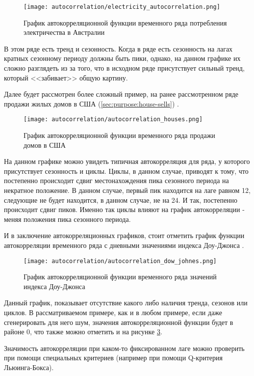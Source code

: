 \begin{figure}[h]
\centering
	\texttt{[image: autocorrelation/electricity\_autocorrelation.png]}
	\caption{График автокорреляционной функции временного ряда потребления электричества в Австралии}
	\label{sec:autocorrelation:autocorrelation_electricity}
\end{figure}

В этом ряде есть тренд и сезонность. Когда в ряде есть сезонность на лагах кратных сезонному периоду должны быть пики, однако, на данном графике их сложно разглядеть из за того, что в исходном ряде присутствует сильный тренд, который <<забивает>> общую картину.

Далее будет рассмотрен более сложный пример, на ранее рассмотренном ряде продажи жилых домов в США (\ref{sec:purpose:house-sells}) \cite{datamining_in_action}.

\begin{figure}[h]
\centering
	\texttt{[image: autocorrelation/autocorrelation\_houses.png]}
	\caption{График автокорреляционной функции временного ряда продажи домов в США}
	\label{sec:autocorrelation:autocorrelation_electricity}
\end{figure}

На данном графике можно увидеть типичная автокорреляция для ряда, у которого присутствует сезонность и циклы. Циклы, в данном случае, приводят к тому, что постепенно происходит сдвиг местонахождения пика сезонного периода на некратное положение. В данном случае, первый пик находится на лаге равном 12, следующие не будет находится, в данном случае, не на 24. И так, постепенно происходит сдвиг пиков. Именно так циклы влияют на график автокорреляции - меняя положения пика сезонного периода.

И в заключение автокорреляционных графиков, стоит отметить график функции автокорреляции временного ряда с дневными значениями индекса Доу-Джонса \cite{datamining_in_action}.

\begin{figure}[h]
\centering
	\texttt{[image: autocorrelation/autocorrelation\_dow\_johnes.png]}
	\caption{График автокорреляционной функции временного ряда значений индекса Доу-Джонса}
	\label{sec:autocorrelation:autocorrelation_dow_johnes}
\end{figure}

Данный график, показывает отсутствие какого либо наличия тренда, сезонов или циклов. В рассматриваемом примере, как и в любом примере, если даже сгенерировать для него шум, значения автокорреляционной функции будет в районе 0, что также можно отметить и на рисунке \ref{sec:autocorrelation:autocorrelation_dow_johnes}.

Значимость автокорреляции при каком-то фиксированном лаге можно проверить при помощи специальных критериев (например при помощи Q-критерия Льюинга-Бокса).